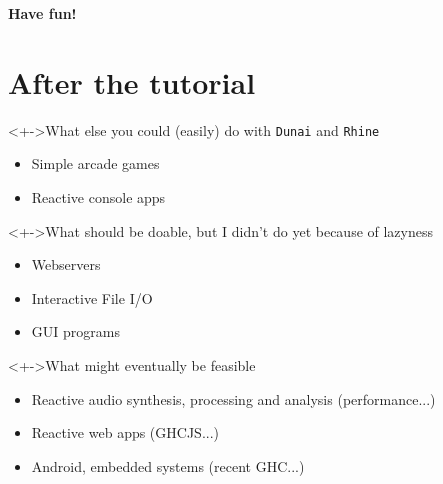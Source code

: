 \documentclass[handout]{enigtex-beamer-base}
\begin{document}
\begin{frame}
\textbf{Have fun!}
\end{frame}

\section{After the tutorial}

\begin{frame}
	\begin{block}<+->{What else you could (easily) do with \texttt{Dunai} and \texttt{Rhine}}
		\begin{itemize}
			\item Simple arcade games
			\item Reactive console apps
		\end{itemize}
	\end{block}
	\begin{block}<+->{What should be doable, but I didn't do yet because of lazyness}
		\begin{itemize}
			\item Webservers
			\item Interactive File I/O
			\item GUI programs
		\end{itemize}
	\end{block}
	\begin{block}<+->{What might eventually be feasible}
		\begin{itemize}
			\item Reactive audio synthesis, processing and analysis (performance...)
			\item Reactive web apps (GHCJS...)
			\item Android, embedded systems (recent GHC...)
		\end{itemize}
	\end{block}
\end{frame}
\end{document}
